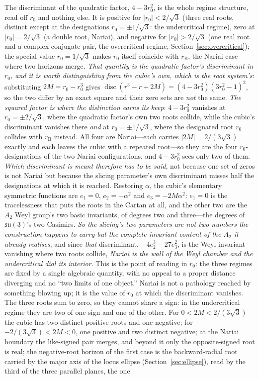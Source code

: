 \documentclass[11pt,a4paper]{article}
\theoremstyle{definition}
\begin{document}
The discriminant of the quadratic factor, $4-3r_{0}^{2}$, is the whole regime structure, read off $r_{0}$ and nothing else. It is positive for $|r_{0}|<2/\sqrt{3}$ (three real roots, distinct except at the designations $r_{0}=\pm1/\sqrt3$: the undercritical regime), zero at $|r_{0}|=2/\sqrt{3}$ (a double root, Nariai), and negative for $|r_{0}|>2/\sqrt{3}$ (one real root and a complex-conjugate pair, the overcritical regime, Section~\ref{sec:overcritical}); the special value $r_{0}=1/\sqrt{3}$ makes $r_{0}$ itself coincide with $r_{\mathrm{B}}$, the Nariai case where two horizons merge. \emph{That quantity is the quadratic factor's discriminant in $r_{0}$, and it is worth distinguishing from the cubic's own, which is the root system's}: substituting $2M=r_{0}-r_{0}^{3}$ gives $\operatorname{disc}(r^{3}-r+2M)=(4-3r_{0}^{2})(3r_{0}^{2}-1)^{2}$, so the two differ by an exact square and their zero sets are \emph{not} the same. \emph{The squared factor is where the distinction earns its keep}: $4-3r_{0}^{2}$ vanishes at $r_{0}=\pm2/\sqrt3$, where the quadratic factor's own two roots collide, while the cubic's discriminant vanishes there \emph{and} at $r_{0}=\pm1/\sqrt3$, where the designated root $r_{0}$ collides with $r_{\mathrm{B}}$ instead. All four are Nariai---each carries $|2M|=2/(3\sqrt3)$ exactly and each leaves the cubic with a repeated root---so they are the four $r_{0}$-designations of the two Nariai configurations, and $4-3r_{0}^{2}$ sees only two of them. \emph{Which discriminant is meant therefore has to be said}, not because one set of zeros is not Nariai but because the slicing parameter's own discriminant misses half the designations at which it is reached. Restoring $\alpha$, the cubic's elementary symmetric functions are $e_{1}=0$, $e_{2}=-\alpha^{2}$ and $e_{3}=-2M\alpha^{2}$: $e_{1}=0$ is the tracelessness that puts the roots in the Cartan at all, and the other two are the $A_{2}$ Weyl group's two basic invariants, of degrees two and three---the degrees of $\mathfrak{su}(3)$'s two Casimirs. \emph{So the slicing's two parameters are not two numbers the construction happens to carry but the complete invariant content of the $A_{2}$ it already realises}; and since \emph{that} discriminant, $-4e_{2}^{3}-27e_{3}^{2}$, is the Weyl invariant vanishing where two roots collide, \emph{Nariai is the wall of the Weyl chamber and the undercritical dial its interior}. This is the point of reading in $r_{0}$: the three regimes are fixed by a single algebraic quantity, with no appeal to a proper distance diverging and no ``two limits of one object.'' Nariai is not a pathology reached by something blowing up; it is the value of $r_{0}$ at which the discriminant vanishes. The three roots sum to zero, so they cannot share a sign: in the undercritical regime they are two of one sign and one of the other. For $0<2M<2/(3\sqrt3)$ the cubic has two distinct positive roots and one negative; for $-2/(3\sqrt3)<2M<0$, one positive and two distinct negative; at the Nariai boundary the like-signed pair merges, and beyond it only the opposite-signed root is real; the negative-root horizon of the first case is the backward-radial root carried by the major axis of the locus ellipse (Section~\ref{sec:ellipse}), read by the third of the three parallel planes, the one 
\end{document}
